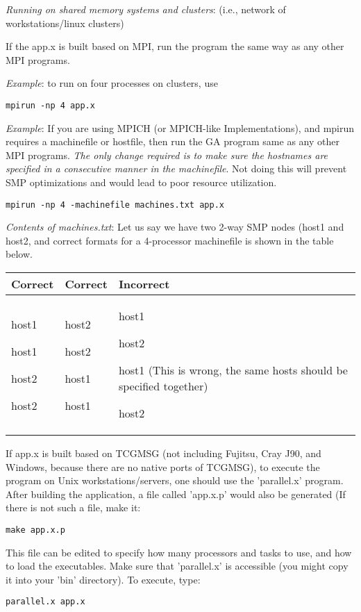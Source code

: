 \emph{Running on shared memory systems and clusters}: (i.e., network of
workstations/linux clusters)

If the app.x is built based on MPI, run the program the same way as any other
MPI programs. 

\emph{Example}: to run on four processes on clusters, use 
\begin{verbatim}
mpirun -np 4 app.x
\end{verbatim}
\emph{Example}: If you are using MPICH (or MPICH-like Implementations), and
mpirun requires a machinefile or hostfile, then run the GA program same as any
other MPI programs. \textit{The only change required is to make sure the
hostnames are specified in a consecutive manner in the machinefile}. Not doing
this will prevent SMP optimizations and would lead to poor resource
utilization.
\begin{verbatim}
mpirun -np 4 -machinefile machines.txt app.x
\end{verbatim}
\emph{Contents of machines.txt}: Let us say we have two 2-way SMP
nodes (host1 and host2, and correct formats for a 4-processor machinefile
is shown in the table below.

\begin{tabular}{|>{\centering}p{2cm}|>{\centering}p{2cm}|>{\raggedright}p{3cm}|}
\hline 
Correct & Correct & Incorrect\tabularnewline
\hline
\hline 
host1

host1

host2

host2 & host2

host2

host1

host1 & host1

host2

host1 (This is wrong, the same hosts should be specified together)

host2\tabularnewline
\hline
\end{tabular}

If app.x is built based on TCGMSG (not including Fujitsu, Cray J90, and
Windows, because there are no native ports of TCGMSG), to execute the program
on Unix workstations/servers, one should use the 'parallel.x' program. After
building the application, a file called 'app.x.p' would also be generated (If
there is not such a file, make it: 
\begin{verbatim}
make app.x.p
\end{verbatim}
This file can be edited to specify how many processors and tasks to use, and
how to load the executables. Make sure that 'parallel.x' is accessible (you
might copy it into your 'bin' directory). To execute, type:
\begin{verbatim}
parallel.x app.x
\end{verbatim}

